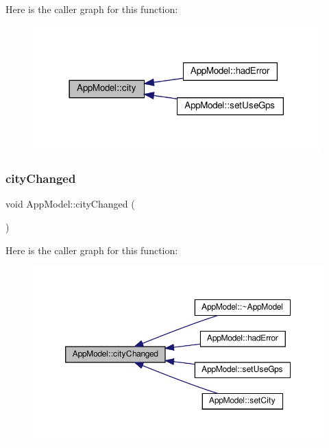Here is the caller graph for this function\+:\nopagebreak
\begin{figure}[H]
\begin{center}
\leavevmode
\includegraphics[width=314pt]{class_app_model_a093066c81b5fe2c1361df8fd19a21f51_icgraph}
\end{center}
\end{figure}
\mbox{\label{class_app_model_aeb28c7a57316aaf6295a943a65f60569}} 
\subsubsection{\texorpdfstring{city\+Changed}{cityChanged}}
{\footnotesize\ttfamily void App\+Model\+::city\+Changed (\begin{DoxyParamCaption}{ }\end{DoxyParamCaption})\hspace{0.3cm}{\ttfamily [signal]}}

Here is the caller graph for this function\+:\nopagebreak
\begin{figure}[H]
\begin{center}
\leavevmode
\includegraphics[width=350pt]{class_app_model_aeb28c7a57316aaf6295a943a65f60569_icgraph}
\end{center}
\end{figure}
\mbox{\label{class_app_model_aa9209b2390924841a009ab0d22b9a1b3}} 
